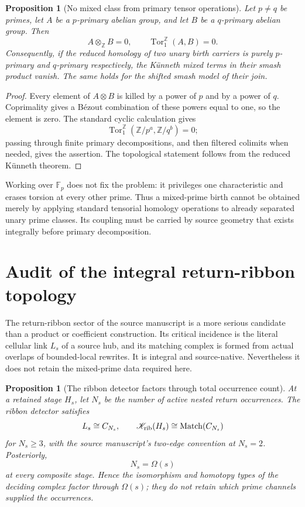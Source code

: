 \documentclass[11pt]{article}
\newtheorem{proposition}[theorem]{Proposition}
\begin{document}
\begin{proposition}[No mixed class from primary tensor operations]
\label{prop:primary-tensor}
Let \(p\ne q\) be primes, let \(A\) be a \(p\)-primary abelian group, and let
\(B\) be a \(q\)-primary abelian group.  Then
\[
A\otimes_{\mathbb Z}B=0,
\qquad
\operatorname{Tor}_1^{\mathbb Z}(A,B)=0.
\]
Consequently, if the reduced homology of two unary birth carriers is purely
\(p\)-primary and \(q\)-primary respectively, the K\"unneth mixed terms in
their smash product vanish.  The same holds for the shifted smash model of
their join.
\end{proposition}

\begin{proof}
Every element of \(A\otimes B\) is killed by a power of \(p\) and by a power
of \(q\).  Coprimality gives a B\'ezout combination of these powers equal to
one, so the element is zero.  The standard cyclic calculation gives
\[
\operatorname{Tor}_1^{\mathbb Z}
(\mathbb Z/p^a,\mathbb Z/q^b)=0;
\]
passing through finite primary decompositions, and then filtered colimits when
needed, gives the assertion.  The topological statement follows from the
reduced K\"unneth theorem.
\end{proof}

Working over \(\mathbb F_p\) does not fix the problem: it privileges one
characteristic and erases torsion at every other prime.  Thus a mixed-prime
birth cannot be obtained merely by applying standard tensorial homology
operations to already separated unary prime classes.  Its coupling must be
carried by source geometry that exists integrally before primary
decomposition.

\section{Audit of the integral return-ribbon topology}

The return-ribbon sector of the source manuscript is a more serious candidate
than a product or coefficient construction.  Its critical incidence is the
literal cellular link \(L_s\) of a source hub, and its matching complex is
formed from actual overlaps of bounded-local rewrites.  It is integral and
source-native.  Nevertheless it does not retain the mixed-prime data required
here.

\begin{proposition}[The ribbon detector factors through total occurrence count]
\label{prop:ribbon-count}
At a retained stage \(H_s\), let \(N_s\) be the number of active nested return
occurrences.  The ribbon detector satisfies
\[
L_s\cong C_{N_s},
\qquad
\mathscr K_{\rm rib}(H_s)
\cong
\operatorname{Match}(C_{N_s})
\]
for \(N_s\ge3\), with the source manuscript's two-edge convention at
\(N_s=2\).  Posteriorly,
\[
N_s=\Omega(s)
\]
at every composite stage.  Hence the isomorphism and homotopy types of the
deciding complex factor through \(\Omega(s)\); they do not retain which prime
channels supplied the occurrences.
\end{proposition}
\end{document}
